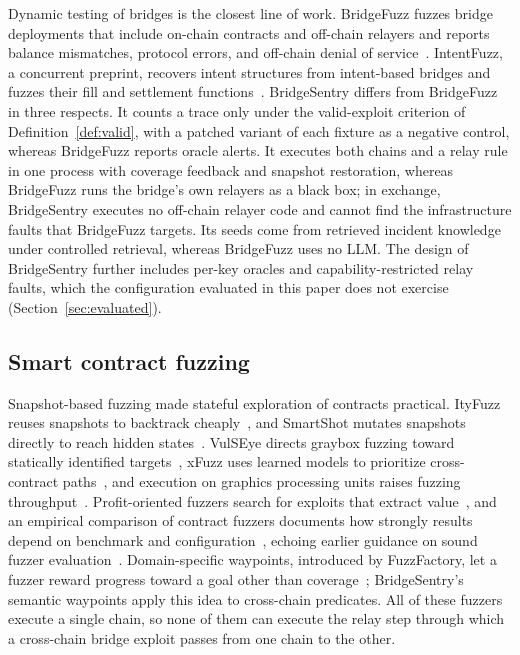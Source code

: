\documentclass[a4paper]{cas-sc}
\begin{document}
Dynamic testing of bridges is the closest line of work. BridgeFuzz fuzzes bridge deployments that include on-chain contracts and off-chain relayers and reports balance mismatches, protocol errors, and off-chain denial of service~\citep{winkler2026bridgefuzz}. IntentFuzz, a concurrent preprint, recovers intent structures from intent-based bridges and fuzzes their fill and settlement functions~\citep{augusto2026intentfuzz}. BridgeSentry differs from BridgeFuzz in three respects. It counts a trace only under the valid-exploit criterion of Definition~\ref{def:valid}, with a patched variant of each fixture as a negative control, whereas BridgeFuzz reports oracle alerts. It executes both chains and a relay rule in one process with coverage feedback and snapshot restoration, whereas BridgeFuzz runs the bridge's own relayers as a black box; in exchange, BridgeSentry executes no off-chain relayer code and cannot find the infrastructure faults that BridgeFuzz targets. Its seeds come from retrieved incident knowledge under controlled retrieval, whereas BridgeFuzz uses no LLM. The design of BridgeSentry further includes per-key oracles and capability-restricted relay faults, which the configuration evaluated in this paper does not exercise (Section~\ref{sec:evaluated}).

\subsection{Smart contract fuzzing}

Snapshot-based fuzzing made stateful exploration of contracts practical. ItyFuzz reuses snapshots to backtrack cheaply~\citep{shou2023ityfuzz}, and SmartShot mutates snapshots directly to reach hidden states~\citep{liang2025smartshot}. VulSEye directs graybox fuzzing toward statically identified targets~\citep{liang2025vulseye}, xFuzz uses learned models to prioritize cross-contract paths~\citep{xue2024xfuzz}, and execution on graphics processing units raises fuzzing throughput~\citep{chen2024gpufuzzing}. Profit-oriented fuzzers search for exploits that extract value~\citep{ye2024midas, kong2025fuzzing, han2025cpmmx}, and an empirical comparison of contract fuzzers documents how strongly results depend on benchmark and configuration~\citep{wu2024fuzzers}, echoing earlier guidance on sound fuzzer evaluation~\citep{klees2018evaluating}. Domain-specific waypoints, introduced by FuzzFactory, let a fuzzer reward progress toward a goal other than coverage~\citep{padhye2019fuzzfactory}; BridgeSentry's semantic waypoints apply this idea to cross-chain predicates. All of these fuzzers execute a single chain, so none of them can execute the relay step through which a cross-chain bridge exploit passes from one chain to the other.
\end{document}
